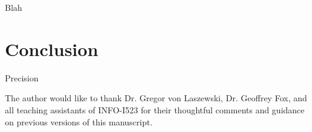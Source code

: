 \setlength{\parskip}{1em}\noindent 
Blah 

\section{Conclusion}
Precision


\begin{acks}
The author would like to thank Dr. Gregor von Laszewski, Dr. Geoffrey Fox, and all teaching assistants of INFO-I523 for their thoughtful comments and guidance on previous versions of this manuscript.

\end{acks}


